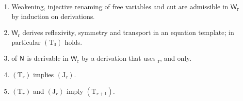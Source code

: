 \begin{lemma}
\label{wit:lem:recon-rules}
\leavevmode
\begin{enumerate}[label=\textup{(\roman*)}]
\item Weakening, injective renaming of free variables and cut are
 admissible in $\mathsf{W}_{\mathrm r}$ by induction on derivations.
\item $\mathsf{W}_{\mathrm r}$ derives reflexivity, symmetry and transport in
 an equation template; in particular $(\mathrm T_0)$ holds.
\item {} of $\mathsf{N}$ is derivable in $\mathsf{W}_{\mathrm r}$ by a
 derivation that uses $_{\mathrm r}$,  and
  only.
\item $(\mathrm T_r)$ implies $(\mathrm J_r)$.
\item $(\mathrm T_r)$ and $(\mathrm J_r)$ imply $(\mathrm T_{r+1})$.
\end{enumerate}
\end{lemma}

